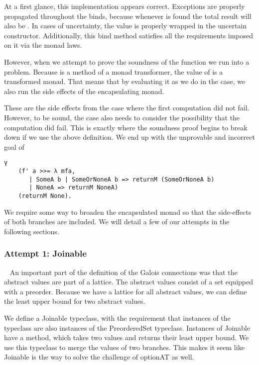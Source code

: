 At a first glance, this implementation appears correct. Exceptions are properly
propagated throughout the binds, because whenever  is found the total
result will also be . In cases of uncertainty, the value is properly
wrapped in the uncertain  constructor. Additionally, this bind
method satisfies all the requirements imposed on it via the monad laws.

However, when we attempt to prove the soundness of the function we run into a
problem. Because  is a method of a monad transformer, the
value of  is a transformed monad. That means that by evaluating it as
we do in the  case, we also run the side effects of the
encapsulating monad. 

These are the side effects from the case where the first computation did not 
fail. However, to be sound, the  case also needs to consider
the possibility that the computation did fail. This is exactly where the
soundness proof begins to break down if we use the above definition. We end up
with the unprovable and incorrect goal of 

\begin{verbatim}
γ 
    (f' a >>= λ mfa,
       | SomeA b | SomeOrNoneA b => returnM (SomeOrNoneA b) 
       | NoneA => returnM NoneA) 
    (returnM None).
\end{verbatim}

We require some way to broaden the encapsulated monad so that the side-effects of
both branches are included. We will detail a few of our attempts in the
following sections.

\subsubsection{Attempt 1: Joinable}~\label{sec:optionat_join}
An important part of the definition of the Galois connections was that the
abstract values are part of a lattice. The abstract values consist of a set
equipped with a preorder. Because we have a lattice for all abstract values, we
can define the least upper bound for two abstract values.

We define a Joinable typeclass, with the requirement that instances of the
typeclass are also instances of the PreorderedSet typeclass. Instances of
Joinable have a  method, which takes two values and returns their
least upper bound. We use this typeclass to merge the values of two branches.
This makes it seem like Joinable is the way to solve the challenge of optionAT
as well.

